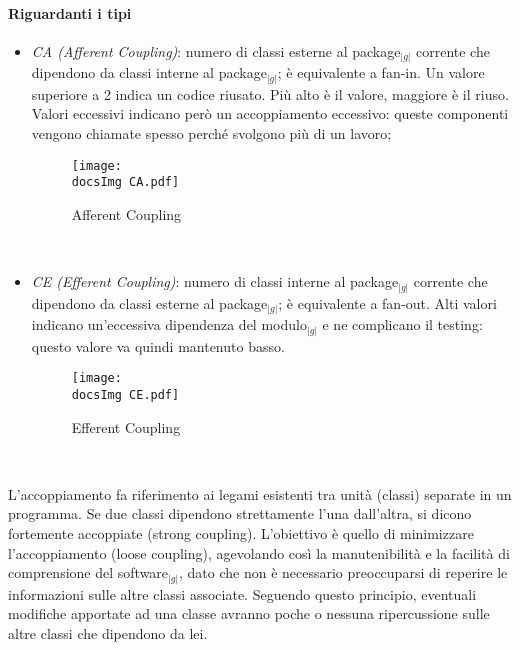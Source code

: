 {\paragraph{Riguardanti i tipi}\hbox{}
  \begin{itemize}
    \item \textit{CA (Afferent Coupling)}:  numero di classi esterne al package$_{|g|}$ corrente che dipendono da classi interne al package$_{|g|}$; è equivalente a fan-in. Un valore superiore a 2 indica un  codice riusato. Più alto è il valore, maggiore è il riuso. Valori eccessivi indicano però un accoppiamento eccessivo: queste componenti vengono chiamate spesso perché svolgono più di un lavoro; 
    \begin{figure}[h!]
	    \centering
	    \texttt{[image: \\docsImg CA.pdf]}
	    \caption{Afferent Coupling}
	\end{figure} \\
    \newpage
    \item \textit{CE (Efferent Coupling)}: numero di classi interne al package$_{|g|}$ corrente che dipendono da classi esterne al package$_{|g|}$; è equivalente a fan-out. Alti valori 
	  indicano un’eccessiva dipendenza del modulo$_{|g|}$ e ne complicano il testing: questo valore va quindi mantenuto basso.
	   \begin{figure}[h!]
	    \centering
	    \texttt{[image: \\docsImg CE.pdf]}
	    \caption{Efferent Coupling}
	   \end{figure} \\
	  
  \end{itemize}
  L’accoppiamento fa riferimento ai legami esistenti tra unità (classi) separate in un programma. Se due classi dipendono strettamente l’una dall’altra, si dicono fortemente accoppiate 
  (strong coupling). L’obiettivo è quello di minimizzare l’accoppiamento (loose coupling), agevolando così la manutenibilità e la facilità di comprensione del software$_{|g|}$, dato che 
  non è necessario preoccuparsi di reperire le informazioni sulle altre classi associate. Seguendo questo principio, eventuali modifiche apportate ad una classe avranno poche o nessuna 
  ripercussione sulle altre classi che dipendono da lei.

}
